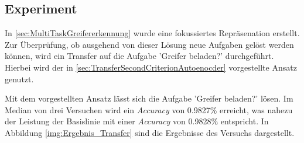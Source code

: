 	\subsection{Experiment}
	\label{subsec:TransferLogs}
	In \ref{sec:MultiTaskGreifererkennung} wurde eine fokussiertes Repräsenation erstellt. Zur Überprüfung, ob ausgehend von dieser Lösung neue Aufgaben gelöst werden können, wird ein Transfer auf die Aufgabe 'Greifer beladen?' durchgeführt. Hierbei wird der in \ref{sec:TransferSecondCriterionAutoenocder} vorgestellte Ansatz genutzt.  
	
	Mit dem vorgestellten Ansatz lässt sich die Aufgabe 'Greifer beladen?' lösen. Im Median von drei Versuchen wird ein \textit{Accuracy} von 0.9827\% erreicht, was nahezu der Leistung der Basislinie mit einer \textit{Accuracy} von 0.9828\% entspricht. In Abbildung \ref{img:Ergebnis_Transfer} sind die Ergebnisse des Versuchs dargestellt.
	
